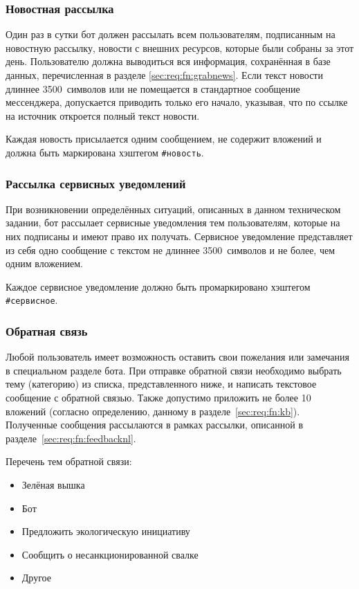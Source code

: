 \subsubsection{Новостная рассылка}
    \label{sec:req:fn:news}
    Один раз в сутки бот
    должен рассылать всем пользователям, подписанным на новостную рассылку, новости с внешних
    ресурсов, которые были собраны за этот день. Пользователю
    должна выводиться вся информация, сохранённая в базе данных, перечисленная в разделе
    \ref{sec:req:fn:grabnews}. Если текст новости длиннее 3500~символов или не помещается в
    стандартное сообщение мессенджера, допускается приводить только его начало, указывая,
    что по ссылке на источник откроется полный текст новости.

    Каждая новость присылается одним сообщением, не содержит вложений и
    должна быть маркирована хэштегом \hbox{\texttt{\#новость}}.

\subsubsection{Рассылка сервисных уведомлений}
    \label{sec:req:fn:service}
    При возникновении определённых ситуаций, описанных в данном техническом задании,
    бот рассылает сервисные уведомления тем пользователям, которые на них подписаны и имеют
    право их получать. Сервисное уведомление представляет из себя одно сообщение с текстом
    не длиннее 3500~символов и не более, чем одним вложением.

    Каждое сервисное уведомление должно быть промаркировано хэштегом \hbox{\texttt{\#сервисное}}.

\subsubsection{Обратная связь}
    \label{sec:req:fn:feedback}
    Любой пользователь имеет возможность оставить свои пожелания или замечания в специальном
    разделе бота. При отправке обратной связи необходимо выбрать тему (категорию) из списка,
    представленного ниже, и написать текстовое сообщение с обратной связью.
    Также допустимо приложить не более 10 вложений (согласно определению, данному в
    разделе~\ref{sec:req:fn:kb}). Полученные сообщения рассылаются в рамках рассылки,
    описанной в разделе~\ref{sec:req:fn:feedbacknl}.

    Перечень тем обратной связи:
    \begin{itemize}
        \item
            Зелёная вышка
        \item
            Бот
        \item
            Предложить экологическую инициативу
        \item
            Сообщить о несанкционированной свалке
        \item
            Другое
    \end{itemize}

